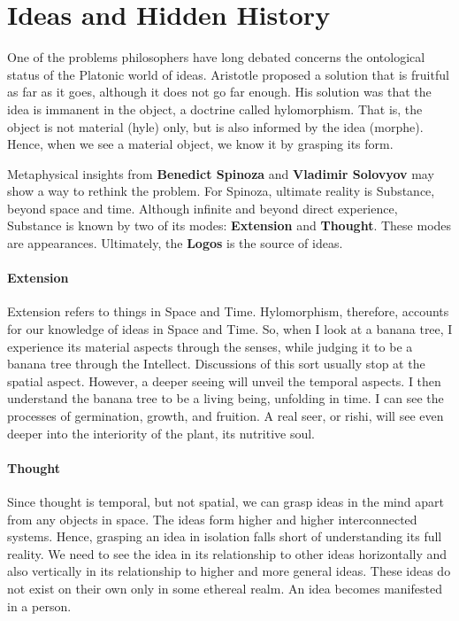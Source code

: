 \section{Ideas and Hidden History}

One of the problems philosophers have long debated concerns the ontological status of the Platonic world of ideas. Aristotle proposed a solution that is fruitful as far as it goes, although it does not go far enough. His solution was that the idea is immanent in the object, a doctrine called hylomorphism. That is, the object is not material (hyle) only, but is also informed by the idea (morphe). Hence, when we see a material object, we know it by grasping its form.

Metaphysical insights from \textbf{Benedict Spinoza} and \textbf{Vladimir Solovyov} may show a way to rethink the problem. For Spinoza, ultimate reality is Substance, beyond space and time. Although infinite and beyond direct experience, Substance is known by two of its modes: \textbf{Extension} and \textbf{Thought}. These modes are appearances. Ultimately, the \textbf{Logos} is the source of ideas.

\paragraph{Extension}
Extension refers to things in Space and Time. Hylomorphism, therefore, accounts for our knowledge of ideas in Space and Time. So, when I look at a banana tree, I experience its material aspects through the senses, while judging it to be a banana tree through the Intellect. Discussions of this sort usually stop at the spatial aspect. However, a deeper seeing will unveil the temporal aspects. I then understand the banana tree to be a living being, unfolding in time. I can see the processes of germination, growth, and fruition. A real seer, or rishi, will see even deeper into the interiority of the plant, its nutritive soul.

\paragraph{Thought}
Since thought is temporal, but not spatial, we can grasp ideas in the mind apart from any objects in space. The ideas form higher and higher interconnected systems. Hence, grasping an idea in isolation falls short of understanding its full reality. We need to see the idea in its relationship to other ideas horizontally and also vertically in its relationship to higher and more general ideas. These ideas do not exist on their own only in some ethereal realm. An idea becomes manifested in a person.

